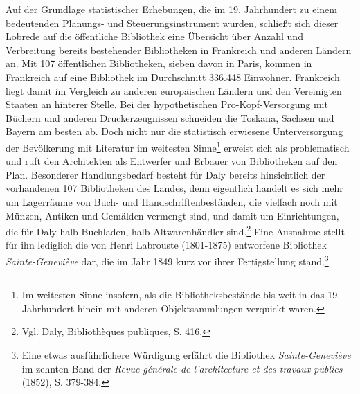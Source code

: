 Auf der Grundlage statistischer Erhebungen, die im 19. Jahrhundert zu
einem bedeutenden Planungs- und Steuerungsinstrument wurden, schließt
sich dieser Lobrede auf die öffentliche Bibliothek eine Übersicht über
Anzahl und Verbreitung bereits bestehender Bibliotheken in Frankreich
und anderen Ländern an. Mit 107 öffentlichen Bibliotheken, sieben davon
in Paris, kommen in Frankreich auf eine Bibliothek im Durchschnitt
336.448 Einwohner. Frankreich liegt damit im Vergleich zu anderen
europäischen Ländern und den Vereinigten Staaten an hinterer Stelle. Bei
der hypothetischen Pro-Kopf-Versorgung mit Büchern und anderen
Druckerzeugnissen schneiden die Toskana, Sachsen und Bayern am besten
ab. Doch nicht nur die statistisch erwiesene Unterversorgung der
Bevölkerung mit Literatur im weitesten Sinne\footnote{Im weitesten Sinne
  insofern, als die Bibliotheksbestände bis weit in das 19. Jahrhundert
  hinein mit anderen Objektsammlungen verquickt waren.} erweist sich als
problematisch und ruft den Architekten als Entwerfer und Erbauer von
Bibliotheken auf den Plan. Besonderer Handlungsbedarf besteht für Daly
bereits hinsichtlich der vorhandenen 107 Bibliotheken des Landes, denn
eigentlich handelt es sich mehr um Lagerräume von Buch- und
Handschriftenbeständen, die vielfach noch mit Münzen, Antiken und
Gemälden vermengt sind, und damit um Einrichtungen, die für Daly halb
Buchladen, halb Altwarenhändler sind.\footnote{Vgl. Daly, Bibliothèques
  publiques, S. 416.} Eine Ausnahme stellt für ihn lediglich die von
Henri Labrouste (1801-1875) entworfene Bibliothek
\emph{Sainte-Geneviève} dar, die im Jahr 1849 kurz vor ihrer
Fertigstellung stand.\footnote{Eine etwas ausführlichere Würdigung
  erfährt die Bibliothek \emph{Sainte-Geneviève} im zehnten Band der
  \emph{Revue générale de l'architecture et des travaux publics} (1852),
  S. 379-384.}

